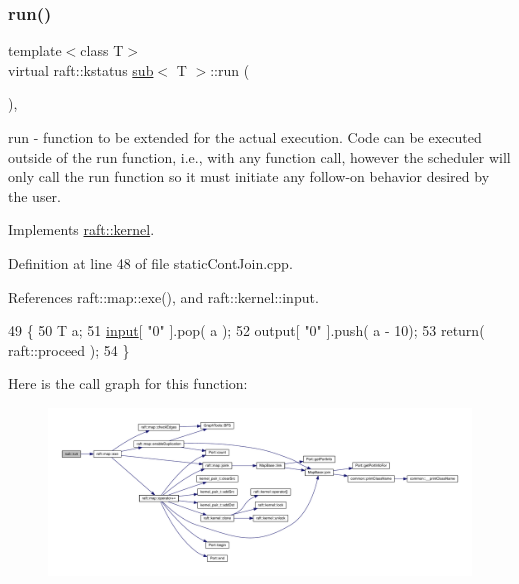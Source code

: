 \subsubsection{\texorpdfstring{run()}{run()}\hspace{0.1cm}{\footnotesize\ttfamily [1/12]}}
{\footnotesize\ttfamily template$<$class T$>$ \\
virtual raft\+::kstatus \hyperlink{classsub}{sub}$<$ T $>$\+::run (\begin{DoxyParamCaption}{ }\end{DoxyParamCaption})\hspace{0.3cm}{\ttfamily [inline]}, {\ttfamily [virtual]}}

run -\/ function to be extended for the actual execution. Code can be executed outside of the run function, i.\+e., with any function call, however the scheduler will only call the run function so it must initiate any follow-\/on behavior desired by the user. 

Implements \hyperlink{classraft_1_1kernel_a05094286d7577360fb1b91c91fc05901}{raft\+::kernel}.



Definition at line 48 of file static\+Cont\+Join.\+cpp.



References raft\+::map\+::exe(), and raft\+::kernel\+::input.


\begin{DoxyCode}
49     \{
50         T a;
51         \hyperlink{classraft_1_1kernel_a6edbe35a56409d402e719b3ac36d6554}{input}[ \textcolor{stringliteral}{"0"} ].pop( a );
52         output[ \textcolor{stringliteral}{"0"} ].push( a - 10);
53         \textcolor{keywordflow}{return}( raft::proceed );
54     \}
\end{DoxyCode}
Here is the call graph for this function\+:
\nopagebreak
\begin{figure}[H]
\begin{center}
\leavevmode
\includegraphics[width=350pt]{classsub_a0a0c7461433ee8b5f4b24305282bf69a_cgraph}
\end{center}
\end{figure}
\hypertarget{classsub_a0a0c7461433ee8b5f4b24305282bf69a}{}\label{classsub_a0a0c7461433ee8b5f4b24305282bf69a} 
